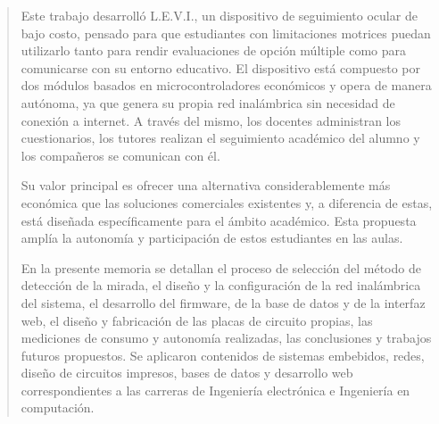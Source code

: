 \documentclass[
	11pt, %
	oneside, %
	spanish,
	singlespacing, %
	parskip, %
	headsepline, %
]{MastersDoctoralThesis} %
\renewcommand{\listtablename}{Índice de Tablas}
\begin{document}

\begin{abstract}
\addchaptertocentry{\abstractname} %
%
\centering

Este trabajo desarrolló L.E.V.I., un dispositivo de seguimiento ocular de bajo costo, pensado para que estudiantes con limitaciones motrices puedan utilizarlo tanto para rendir evaluaciones de opción múltiple como para comunicarse con su entorno educativo. El dispositivo está compuesto por dos módulos basados en microcontroladores económicos y opera de manera autónoma, ya que genera su propia red inalámbrica sin necesidad de conexión a internet. A través del mismo, los docentes administran los cuestionarios, los tutores realizan el seguimiento académico del alumno y los compañeros se comunican con él.

Su valor principal es ofrecer una alternativa considerablemente más económica que las soluciones comerciales existentes y, a diferencia de estas, está diseñada específicamente para el ámbito académico. Esta propuesta amplía la autonomía y participación de estos estudiantes en las aulas.

En la presente memoria se detallan el proceso de selección del método de detección de la mirada, el diseño y la configuración de la red inalámbrica del sistema, el desarrollo del firmware, de la base de datos y de la interfaz web, el diseño y fabricación de las placas de circuito propias, las mediciones de consumo y autonomía realizadas, las conclusiones y trabajos futuros propuestos. Se aplicaron contenidos de sistemas embebidos, redes, diseño de circuitos impresos, bases de datos y desarrollo web correspondientes a las carreras de Ingeniería electrónica e Ingeniería en computación.	

\end{abstract}

\renewcommand{\listtablename}{Índice de Tablas}
\end{document}
